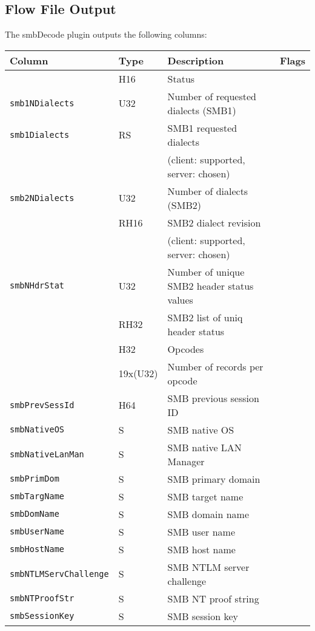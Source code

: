 \documentclass[documentation]{subfiles}
\begin{document}
\subsection{Flow File Output}
The smbDecode plugin outputs the following columns:
\begin{longtable}{llll}
    \toprule
    {\bf Column} & {\bf Type} & {\bf Description} & {\bf Flags}\\
    \midrule\endhead%
    {\tt \nameref{smbStat}} & H16 & Status \\
    {\tt smb1NDialects} & U32 & Number of requested dialects (SMB1)\\
    {\tt smb1Dialects} & RS & SMB1 requested dialects\\
                      & &(client: supported, server: chosen) \\
    {\tt smb2NDialects} & U32 & Number of dialects (SMB2)\\
    {\tt \nameref{smb2Dialects}} & RH16 & SMB2 dialect revision\\
                      & &(client: supported, server: chosen) \\
    {\tt smbNHdrStat} & U32 & Number of unique SMB2 header status values\\
    {\tt \nameref{smbHdrStat}} & RH32 & SMB2 list of uniq header status\\
    {\tt \nameref{smbOpcodes}} & H32 & Opcodes\\
    {\tt \nameref{smbNOpcodes}} & 19x(U32) & Number of records per opcode\\
    {\tt smbPrevSessId} & H64 & SMB previous session ID\\
    {\tt smbNativeOS} & S & SMB native OS\\
    {\tt smbNativeLanMan} & S & SMB native LAN Manager\\
    {\tt smbPrimDom} & S & SMB primary domain\\
    {\tt smbTargName} & S & SMB target name\\
    {\tt smbDomName} & S & SMB domain name\\
    {\tt smbUserName} & S & SMB user name\\
    {\tt smbHostName} & S & SMB host name\\
    {\tt smbNTLMServChallenge} & S & SMB NTLM server challenge\\
    {\tt smbNTProofStr} & S & SMB NT proof string\\
    {\tt smbSessionKey} & S & SMB session key\\

\end{longtable}
\end{document}
